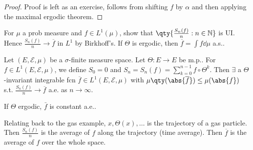 \begin{proof}
	Proof is left as an exercise, follows from shifting $f$ by $\alpha$ and then applying the maximal ergodic theorem.
\end{proof}

\begin{exercise}
	For $\mu$ a prob measure and $f \in L^1(\mu)$, show that $\qty{\frac{S_n(f)}{n} : n \in \mathbb{N}}$ is UI.
	Hence $\frac{S_n(f)}{n} \to \overline f$ in $L^1$ by Birkhoff's.
	If $\Theta$ is ergodic, then $\overline f = \int f \dd{\mu}$ a.s..
\end{exercise}

\begin{theorem}
	Let $(E, \mathcal E, \mu)$ be a $\sigma$-finite measure space.
	Let $\Theta \colon E \to E$ be m.p..
	For $f \in L^1(E, \mathcal{E}, \mu)$, we define $S_0 = 0$ and $S_n = S_n(f) = \sum_{k=0}^{n-1} f \circ \Theta^k$.
	Then $\exists$ a $\Theta$-invariant integrable fcn $\overline f \in L^1(E, \mathcal{E}, \mu)$ with $\mu\qty(\abs{\overline f}) \leq \mu(\abs{f})$ s.t. $\frac{S_n(f)}{n} \to \overline f$ a.e. as $n \to \infty$.
\end{theorem}

\begin{remark}
	If $\Theta$ ergodic, $\bar{f}$ is constant a.e..

	Relating back to the gas example, $x, \Theta(x), \dots$ is the trajectory of a gas particle.
	Then $\frac{S_n(f)}{n}$ is the average of $f$ along the trajectory (time average).
	Then $\overline f$ is the average of $f$ over the whole space.
\end{remark}

